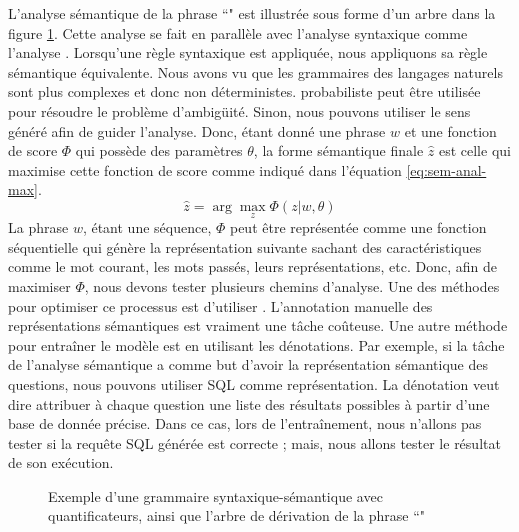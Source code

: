 \documentclass{KodeBook}
\begin{document}
L'analyse sémantique de la phrase ``" est illustrée sous forme d'un arbre dans la figure \ref{fig:regles-sem2}.
Cette analyse se fait en parallèle avec l'analyse syntaxique comme l'analyse . 
Lorsqu'une règle syntaxique est appliquée, nous appliquons sa règle sémantique équivalente.
Nous avons vu que les grammaires des langages naturels sont plus complexes et donc non déterministes. 
 probabiliste peut être utilisée pour résoudre le problème d'ambigüité.
Sinon, nous pouvons utiliser le sens généré afin de guider l'analyse. 
Donc, étant donné une phrase $w$ et une fonction de score $\Phi$ qui possède des paramètres $\theta$, la forme sémantique finale $\hat{z}$ est celle qui maximise cette fonction de score comme indiqué dans l'équation \ref{eq:sem-anal-max}.
\begin{equation}
\hat{z} = \arg\max_z \Phi(z|w, \theta)
\label{eq:sem-anal-max}
\end{equation}
La phrase $w$, étant une séquence, $\Phi$ peut être représentée comme une fonction séquentielle qui génère la représentation suivante sachant des caractéristiques comme le mot courant, les mots passés, leurs représentations, etc. 
Donc, afin de maximiser $\Phi$, nous devons tester plusieurs chemins d'analyse. 
Une des méthodes pour optimiser ce processus est d'utiliser . 
L'annotation manuelle des représentations sémantiques est vraiment une tâche coûteuse.
Une autre méthode pour entraîner le modèle est en utilisant les dénotations. 
Par exemple, si la tâche de l'analyse sémantique a comme but d'avoir la représentation sémantique des questions, nous pouvons utiliser SQL comme représentation. 
La dénotation veut dire attribuer à chaque question une liste des résultats possibles à partir d'une base de donnée précise. 
Dans ce cas, lors de l'entraînement, nous n'allons pas tester si la requête SQL générée est correcte ; mais, nous allons tester le résultat de son exécution. 

\begin{figure}[ht]
	\centering
	\caption[Exemple d'une grammaire syntaxique-sémantique avec quantificateurs]{Exemple d'une grammaire syntaxique-sémantique avec quantificateurs, ainsi que l'arbre de dérivation de la phrase ``" \cite{2018-eisenstein}}
	\label{fig:regles-sem2}
\end{figure}
\end{document}
